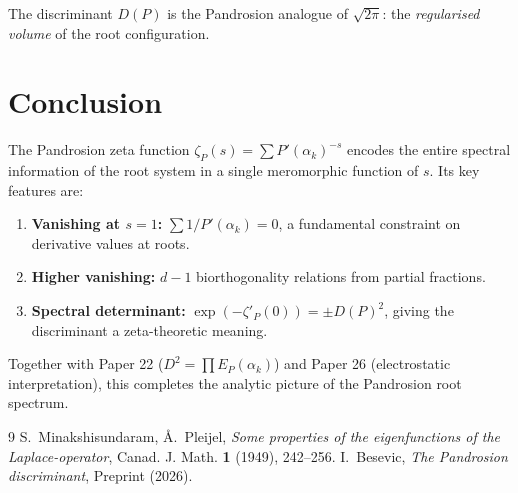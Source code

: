 \documentclass[11pt]{article}
\begin{document}
The discriminant $D(P)$ is the Pandrosion analogue of $\sqrt{2\pi}$: the
\emph{regularised volume} of the root configuration.

\section{Conclusion}

The Pandrosion zeta function $\zeta_P(s) = \sum P'(\alpha_k)^{-s}$ encodes
the entire spectral information of the root system in a single meromorphic
function of $s$. Its key features are:
\begin{enumerate}
\item \textbf{Vanishing at $s = 1$:} $\sum 1/P'(\alpha_k) = 0$,
a fundamental constraint on derivative values at roots.
\item \textbf{Higher vanishing:} $d - 1$ biorthogonality relations from
partial fractions.
\item \textbf{Spectral determinant:} $\exp(-\zeta'_P(0)) = \pm D(P)^2$,
giving the discriminant a zeta-theoretic meaning.
\end{enumerate}

Together with Paper 22 ($D^2 = \prod E_P(\alpha_k)$) and Paper 26
(electrostatic interpretation), this completes the analytic picture of the
Pandrosion root spectrum.

\begin{thebibliography}{9}
 S.~Minakshisundaram, \AA.~Pleijel,
\emph{Some properties of the eigenfunctions of the Laplace-operator},
Canad. J. Math. \textbf{1} (1949), 242--256.
 I.~Besevic,
\emph{The Pandrosion discriminant}, Preprint (2026).
\end{thebibliography}
\end{document}
